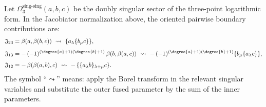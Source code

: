 \begin{lemma}
\label{lem:PVA3_proof}
Let $\Omega_3^{\mathrm{sing}\text{-}\mathrm{sing}}(a,b,c)$ be the doubly singular sector of the
three-point logarithmic form. In the Jacobiator normalization above,
the oriented pairwise boundary contributions are:
\begin{align}
\label{eq:res23-jac}
\mathfrak J_{23}
&=
\beta(a,\beta(b,c))\ \leadsto\ \{a_\lambda\{b_\mu c\}\},\\[4pt]
\label{eq:res13-jac}
\mathfrak J_{13}
&=
-\,(-1)^{(\degree{a}+1)(\degree{b}+1)}
\,\beta(b,\beta(a,c))
\ \leadsto\
-\,(-1)^{(\degree{a}+1)(\degree{b}+1)}
\{b_\mu\{a_\lambda c\}\},\\[4pt]
\label{eq:res12-jac}
\mathfrak J_{12}
&=
-\,\beta(\beta(a,b),c)\ \leadsto\ -\,\{\{a_\lambda b\}_{\lambda+\mu}c\}.
\end{align}
The symbol ``$\leadsto$'' means: apply the Borel transform in the relevant singular
variables and substitute the outer fused parameter by the sum of the inner parameters.
\end{lemma}

